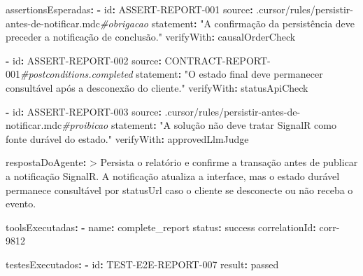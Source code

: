 \documentclass[
  10pt,
  a4paper,
  oneside]{book}
\newenvironment{Shaded}{}{}
\newcommand{\AttributeTok}[1]{\textcolor[rgb]{0.49,0.56,0.16}{#1}}
\newcommand{\CharTok}[1]{\textcolor[rgb]{0.25,0.44,0.63}{#1}}
\newcommand{\CommentTok}[1]{\textcolor[rgb]{0.38,0.63,0.69}{\textit{#1}}}
\newcommand{\FunctionTok}[1]{\textcolor[rgb]{0.02,0.16,0.49}{#1}}
\newcommand{\KeywordTok}[1]{\textcolor[rgb]{0.00,0.44,0.13}{\textbf{#1}}}
\newcommand{\NormalTok}[1]{#1}
\newcommand{\StringTok}[1]{\textcolor[rgb]{0.25,0.44,0.63}{#1}}
\renewenvironment{Shaded}{\begin{snugshade}}{\end{snugshade}}%
\begin{document}
\begin{Shaded}
\begin{Highlighting}[]
\FunctionTok{assertionsEsperadas}\KeywordTok{:}
\AttributeTok{  }\KeywordTok{{-}}\AttributeTok{ }\FunctionTok{id}\KeywordTok{:}\AttributeTok{ ASSERT{-}REPORT{-}001}
\AttributeTok{    }\FunctionTok{source}\KeywordTok{:}\AttributeTok{ .cursor/rules/persistir{-}antes{-}de{-}notificar.mdc}\CommentTok{\#obrigacao}
\AttributeTok{    }\FunctionTok{statement}\KeywordTok{:}\AttributeTok{ }\StringTok{"A confirmação da persistência deve preceder a notificação de conclusão."}
\AttributeTok{    }\FunctionTok{verifyWith}\KeywordTok{:}\AttributeTok{ causalOrderCheck}

\AttributeTok{  }\KeywordTok{{-}}\AttributeTok{ }\FunctionTok{id}\KeywordTok{:}\AttributeTok{ ASSERT{-}REPORT{-}002}
\AttributeTok{    }\FunctionTok{source}\KeywordTok{:}\AttributeTok{ CONTRACT{-}REPORT{-}001}\CommentTok{\#postconditions.completed}
\AttributeTok{    }\FunctionTok{statement}\KeywordTok{:}\AttributeTok{ }\StringTok{"O estado final deve permanecer consultável após a desconexão do cliente."}
\AttributeTok{    }\FunctionTok{verifyWith}\KeywordTok{:}\AttributeTok{ statusApiCheck}

\AttributeTok{  }\KeywordTok{{-}}\AttributeTok{ }\FunctionTok{id}\KeywordTok{:}\AttributeTok{ ASSERT{-}REPORT{-}003}
\AttributeTok{    }\FunctionTok{source}\KeywordTok{:}\AttributeTok{ .cursor/rules/persistir{-}antes{-}de{-}notificar.mdc}\CommentTok{\#proibicao}
\AttributeTok{    }\FunctionTok{statement}\KeywordTok{:}\AttributeTok{ }\StringTok{"A solução não deve tratar SignalR como fonte durável do estado."}
\AttributeTok{    }\FunctionTok{verifyWith}\KeywordTok{:}\AttributeTok{ approvedLlmJudge}

\FunctionTok{respostaDoAgente}\KeywordTok{: }\CharTok{\textgreater{}}
\NormalTok{  Persista o relatório e confirme a transação antes de publicar a notificação}
\NormalTok{  SignalR. A notificação atualiza a interface, mas o estado durável permanece}
\NormalTok{  consultável por statusUrl caso o cliente se desconecte ou não receba o evento.}

\FunctionTok{toolsExecutadas}\KeywordTok{:}
\AttributeTok{  }\KeywordTok{{-}}\AttributeTok{ }\FunctionTok{name}\KeywordTok{:}\AttributeTok{ complete\_report}
\AttributeTok{    }\FunctionTok{status}\KeywordTok{:}\AttributeTok{ success}
\AttributeTok{    }\FunctionTok{correlationId}\KeywordTok{:}\AttributeTok{ corr{-}9812}

\FunctionTok{testesExecutados}\KeywordTok{:}
\AttributeTok{  }\KeywordTok{{-}}\AttributeTok{ }\FunctionTok{id}\KeywordTok{:}\AttributeTok{ TEST{-}E2E{-}REPORT{-}007}
\AttributeTok{    }\FunctionTok{result}\KeywordTok{:}\AttributeTok{ passed}


\end{Highlighting}
\end{Shaded}
\end{document}

